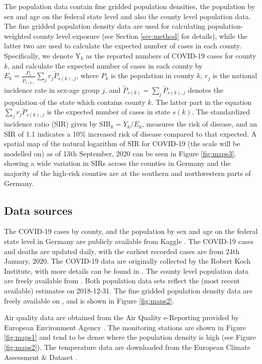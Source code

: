 \documentclass[12,]{article}
\begin{document}
The population data contain fine gridded population densities, the
population by sex and age on the federal state level and also the county
level population data. The fine gridded population density data are used
for calculating population-weighted county level exposure (see Section
\ref{sec:method} for details), while the latter two are used to
calculate the expected number of cases in each county. Specifically, we
denote Y\(_k\) as the reported numbers of COVID-19 cases for county
\(k\), and calculate the expected number of cases in each county by
\(E_k=\frac{P_k}{\tilde{P}_{s(k)}} \sum_j r_j \check{P}_{s(k),j}\),
where \(P_k\) is the population in county \(k\), \(r_j\) is the national
incidence rate in sex-age group \(j\), and
\(\tilde{P}_{s(k)}= \sum_j \check{P}_{s(k),j}\) denotes the population
of the state which contains county \(k\). The latter part in the
equation \(\sum_j r_j \check{P}_{s(k),j}\) is the expected number of
cases in state \(s(k)\). The standardized incidence ratio (SIR) given by
SIR\(_{k}=Y_{k}/E_{k}\), measures the risk of disease, and an SIR of 1.1
indicates a 10\(\%\) increased risk of disease compared to that
expected. A spatial map of the natural logarithm of SIR for COVID-19
(the scale will be modelled on) as of 13th September, 2020 can be seen
in Figure \ref{fig:maps3}, showing a wide variation in SIRs across the
counties in Germany and the majority of the high‐risk counties are at
the southern and northwestern parts of Germany.

\hypertarget{data-sources}{%
\subsection{Data sources}\label{data-sources}}

The COVID-19 cases by county, and the population by sex and age on the
federal state level in Germany are publicly available from Kaggle
\autocite{HeadsorTails2020}. The COVID-19 cases and deaths are updated
daily, with the earliest recorded cases are from 24th January, 2020. The
COVID-19 data are originally collected by the Robert Koch Institute,
with more details can be found in \textcite{HeadsorTails2020}. The
county level population data are freely available from
\textcite{Citypopulation2019}. Both population data sets reflect the
(most recent available) estimates on 2018-12-31. The fine gridded
population density data are freely available on \textcite{DIVAGIS2020},
and is shown in Figure \ref{fig:maps2}.

Air quality data are obtained from the Air Quality e-Reporting provided
by European Environment Agency \autocite{EEA2020}. The monitoring
stations are shown in Figure \ref{fig:maps1} and tend to be dense where
the population density is high (see Figure \ref{fig:maps2}). The
temperature data are downloaded from the European Climate Assessment \&
Dataset \autocite{ECAD2020}.
\end{document}
